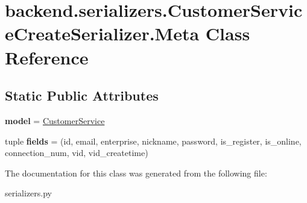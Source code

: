 \hypertarget{classbackend_1_1serializers_1_1_customer_service_create_serializer_1_1_meta}{}\section{backend.\+serializers.\+Customer\+Service\+Create\+Serializer.\+Meta Class Reference}
\label{classbackend_1_1serializers_1_1_customer_service_create_serializer_1_1_meta}
\subsection*{Static Public Attributes}
\begin{DoxyCompactItemize}
\item 
\mbox{\label{classbackend_1_1serializers_1_1_customer_service_create_serializer_1_1_meta_ab1c442911fd2fd8df0d6b7ffb286318c}} 
{\bfseries model} = \hyperlink{classbackend_1_1models_1_1_customer_service}{Customer\+Service}
\item 
\mbox{\label{classbackend_1_1serializers_1_1_customer_service_create_serializer_1_1_meta_aae59f21e55a2452eb316500ded264b6a}} 
tuple {\bfseries fields} = (\textquotesingle{}id\textquotesingle{}, \textquotesingle{}email\textquotesingle{}, \textquotesingle{}enterprise\textquotesingle{}, \textquotesingle{}nickname\textquotesingle{}, \textquotesingle{}password\textquotesingle{}, \textquotesingle{}is\+\_\+register\textquotesingle{}, \textquotesingle{}is\+\_\+online\textquotesingle{}, \textquotesingle{}connection\+\_\+num\textquotesingle{}, \textquotesingle{}vid\textquotesingle{}, \textquotesingle{}vid\+\_\+createtime\textquotesingle{})
\end{DoxyCompactItemize}


The documentation for this class was generated from the following file\+:\begin{DoxyCompactItemize}
\item 
serializers.\+py\end{DoxyCompactItemize}
